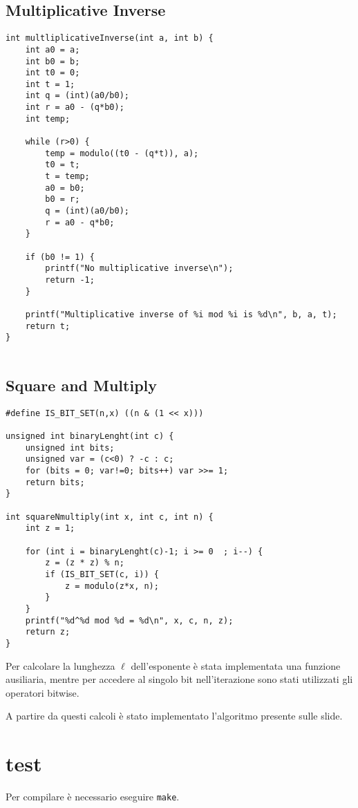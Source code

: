 \documentclass{article}
\begin{document}
\subsection{Multiplicative Inverse}
\begin{lstlisting}[style=CStyle]
int multliplicativeInverse(int a, int b) {
    int a0 = a;
    int b0 = b;
    int t0 = 0;
    int t = 1;
    int q = (int)(a0/b0);
    int r = a0 - (q*b0);
    int temp;

    while (r>0) {
        temp = modulo((t0 - (q*t)), a);
        t0 = t;
        t = temp;
        a0 = b0;
        b0 = r;
        q = (int)(a0/b0);
        r = a0 - q*b0;
    }

    if (b0 != 1) {
        printf("No multiplicative inverse\n");
        return -1;
    }

    printf("Multiplicative inverse of %i mod %i is %d\n", b, a, t);
    return t;
}


\end{lstlisting}

\subsection{Square and Multiply}
\begin{lstlisting}[style=CStyle]
#define IS_BIT_SET(n,x) ((n & (1 << x)))

unsigned int binaryLenght(int c) {
    unsigned int bits;                              
    unsigned var = (c<0) ? -c : c;              
    for (bits = 0; var!=0; bits++) var >>= 1;                                    
    return bits;
}

int squareNmultiply(int x, int c, int n) {
    int z = 1;
    
    for (int i = binaryLenght(c)-1; i >= 0  ; i--) {
        z = (z * z) % n;
        if (IS_BIT_SET(c, i)) {
            z = modulo(z*x, n);
        }
    }
    printf("%d^%d mod %d = %d\n", x, c, n, z);
    return z;
}
\end{lstlisting}
Per calcolare la lunghezza \(\ell\) dell'esponente \`{e} stata implementata una funzione ausiliaria, mentre per accedere al singolo bit nell'iterazione sono stati utilizzati gli operatori bitwise. 

A partire da questi calcoli \`{e} stato implementato l'algoritmo presente sulle slide.

\section{test}
Per compilare \`{e} necessario eseguire \lstinline{make}.
\end{document}
